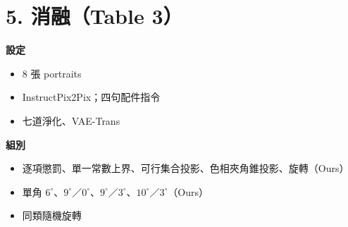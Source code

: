 \documentclass[10pt]{article}
\begin{document}
\section*{5. 消融（Table 3）}
\textbf{設定}
\begin{itemize}
  \item 8 張 portraits
  \item InstructPix2Pix；四句配件指令
  \item 七道淨化、VAE-Trans
\end{itemize}
\textbf{組別}
\begin{itemize}
  \item 逐項懲罰、單一常數上界、可行集合投影、色相夾角錐投影、旋轉（Ours）
  \item 單角 $6^\circ$、$9^\circ$／$0^\circ$、$9^\circ$／$3^\circ$、$10^\circ$／$3^\circ$（Ours）
  \item 同類隨機旋轉
\end{itemize}
\end{document}
